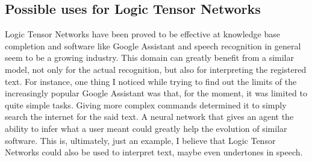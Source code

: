 \documentclass{article}
\begin{document}
\subsection{Possible uses for Logic Tensor Networks}
Logic Tensor Networks have been proved to be effective at knowledge base completion and software like Google Assistant and speech recognition in general seem to be a growing industry. This domain can greatly benefit from a similar model, not only for the actual recognition, but also for interpreting the registered text. For instance, one thing I noticed while trying to find out the limits of the increasingly popular Google Assistant was that, for the moment, it was limited to quite simple tasks. Giving more complex commands determined it to simply search the internet for the said text. A neural network that gives an agent the ability to infer what a user meant could greatly help the evolution of similar software. This is, ultimately, just an example, I believe that Logic Tensor Networks could also be used to interpret text, maybe even undertones in speech.

\end{document}
